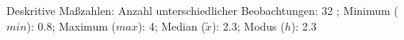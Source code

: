 				\label{tableValues:adem04}
				\vspace*{-\baselineskip}
                    \begin{noten}
                	    \note{} Deskritive Maßzahlen:
                	    Anzahl unterschiedlicher Beobachtungen: 32%
                	    ; 
                	      Minimum ($min$): 0.8; 
                	      Maximum ($max$): 4; 
                	      Median ($\tilde{x}$): 2.3; 
                	      Modus ($h$): 2.3
                     \end{noten}


